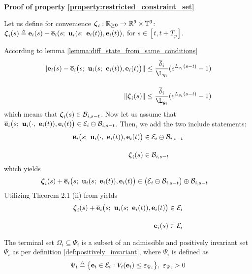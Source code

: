 \begin{gg_box}
\textbf{Proof of property \eqref{property:restricted_constraint_set}}

Let us define for convenience $\bm{\mathbf{\zeta}}_i : \mathbb{R}_{\geq 0} \to \mathbb{R}^9 \times \mathbb{T}^3$:
$\bm{\mathbf{\zeta}}_i(s) \triangleq \bm{\mathbf{e}}_i(s) - \overline{\bm{\mathbf{e}}}_i(s;\ \bm{\mathbf{u}}_i(s;\ \bm{\mathbf{e}}_i(t)), \bm{\mathbf{e}}_i(t))$,
for $s \in [t, t + T_p]$.

According to lemma
\eqref{lemma:diff_state_from_same_conditions}
\begin{align}
 \|\vect{e}_i(s) - \overline{\vect{e}}_i\big(s;\ \vect{u}_i(s;\ \vect{e}_i(t)), \vect{e}_i(t)\big)\|
   &\leq \dfrac{\overline{\delta}_i}{\L_{g_i}} (e^{L_{g_i} (s-t)} - 1) \\[2.5ex]
 \|\vect{\zeta}_i(s)\| &\leq \dfrac{\overline{\delta}_i}{\L_{g_i}} (e^{L_{g_i} (s-t)} - 1)
\end{align}
which means that $\bm{\mathbf{\zeta}}_i(s) \in \mathcal{B}_{i,s-t}$.
Now let us assume that
$\overline{\vect{e}}_i\big( s;\ \vect{u}_i(\cdot,\ \vect{e}_i(t)), \vect{e}_i(t) \big) \in \mathcal{E}_i \ominus \mathcal{B}_{i,s-t}$.
Then, we add the two include statements:
\begin{align}
  \overline{\bm{\mathbf{e}}}_i\big( s;\ \bm{\mathbf{u}}_i(\cdot,\ \bm{\mathbf{e}}_i(t)), \bm{\mathbf{e}}_i(t) \big) &\in \mathcal{E}_i \ominus \mathcal{B}_{i,s-t} \\[2.5ex]
  \bm{\mathbf{\zeta}}_i(s) &\in \mathcal{B}_{i,s-t}
\end{align}
which yields
\begin{align}
  \vect{\zeta}_i(s) + \overline{\vect{e}}_i\big(s;\ \vect{u}_i(s;\ \vect{e}_i(t)), \vect{e}_i(t)\big)
    &\in \big(\mathcal{E}_i \ominus \mathcal{B}_{i,s-t}\big) \oplus \mathcal{B}_{i,s-t}
\end{align}
Utilizing Theorem 2.1 (ii) from \cite{kolmanovsky} yields
\begin{align}
  \vect{\zeta}_i(s) + \overline{\vect{e}}_i\big(s;\ \vect{u}_i(s;\ \vect{e}_i(t)), \vect{e}_i(t)\big) &\in \mathcal{E}_i \\[2.5ex]
  \vect{e}_i(s) &\in \mathcal{E}_i
\end{align}
\qedsymbol
\end{gg_box}


The terminal set $\Omega_i \subseteq \Psi_i$ is a subset of an admissible and
positively invariant set $\Psi_i$ as per definition
\eqref{def:positively_invariant}, where $\Psi_i$ is defined as
\begin{align}
  \Psi_i \triangleq \big\{\bm{\mathbf{e}}_i \in \mathcal{E}_i : V_i(\bm{\mathbf{e}}_i)
    \leq \varepsilon_{\Psi_i} \big\},\ \varepsilon_{\Psi_i} > 0
\end{align}

